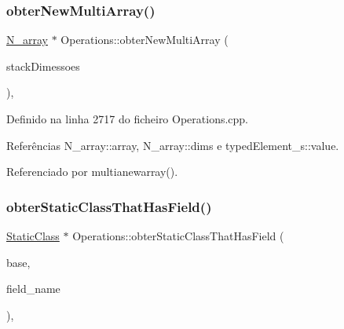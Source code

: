 \mbox{\label{classOperations_a944d6dd757fad81e350513415aaa0c72}} 
\subsubsection{\texorpdfstring{obter\+New\+Multi\+Array()}{obterNewMultiArray()}}
{\footnotesize\ttfamily \hyperlink{structN__array}{N\+\_\+array} $\ast$ Operations\+::obter\+New\+Multi\+Array (\begin{DoxyParamCaption}\item[{stack$<$ int $>$}]{stack\+Dimessoes }\end{DoxyParamCaption})\hspace{0.3cm}{\ttfamily [static]}, {\ttfamily [private]}}



Definido na linha 2717 do ficheiro Operations.\+cpp.



Referências N\+\_\+array\+::array, N\+\_\+array\+::dims e typed\+Element\+\_\+s\+::value.



Referenciado por multianewarray().

\mbox{\label{classOperations_a2e9f822a1a6b9b0fb374eafb5a55f9f4}} 
\subsubsection{\texorpdfstring{obter\+Static\+Class\+That\+Has\+Field()}{obterStaticClassThatHasField()}}
{\footnotesize\ttfamily \hyperlink{classStaticClass}{Static\+Class} $\ast$ Operations\+::obter\+Static\+Class\+That\+Has\+Field (\begin{DoxyParamCaption}\item[{\hyperlink{classStaticClass}{Static\+Class} $\ast$}]{base,  }\item[{string}]{field\+\_\+name }\end{DoxyParamCaption})\hspace{0.3cm}{\ttfamily [static]}, {\ttfamily [private]}}



